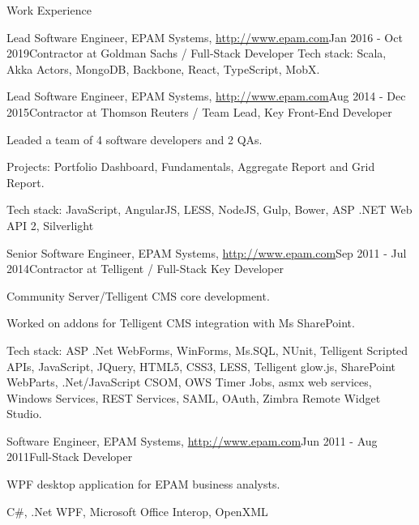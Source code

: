\documentclass{resume}
\begin{document}
\begin{rSection}{Work Experience}
\begin{rSubsection}{Lead Software Engineer, EPAM Systems, \url{http://www.epam.com}}{Jan 2016 - Oct 2019}{Contractor at Goldman Sachs / Full-Stack Developer}{}
Tech stack: Scala, Akka Actors, MongoDB, Backbone, React, TypeScript, MobX.
\end{rSubsection}


\begin{rSubsection}{Lead Software Engineer, EPAM Systems, \url{http://www.epam.com}}{Aug 2014 - Dec 2015}{Contractor at Thomson Reuters / Team Lead, Key Front-End Developer}{}
\item Leaded a team of 4 software developers and 2 QAs.
\item Projects: Portfolio Dashboard, Fundamentals, Aggregate Report and Grid Report.

Tech stack: JavaScript, AngularJS, LESS, NodeJS, Gulp, Bower, ASP .NET Web API 2, Silverlight
\end{rSubsection}

\begin{rSubsection}{Senior Software Engineer, EPAM Systems, \url{http://www.epam.com}}{Sep 2011 - Jul 2014}{Contractor at Telligent / Full-Stack Key Developer}{}
\item Community Server/Telligent CMS core development.
\item Worked on addons for Telligent CMS integration with Ms SharePoint.

Tech stack:  ASP .Net WebForms, WinForms, Ms.SQL, NUnit, Telligent Scripted APIs, JavaScript, JQuery, HTML5,
CSS3, LESS, Telligent glow.js, SharePoint WebParts, .Net/JavaScript CSOM, OWS Timer Jobs, asmx web
services, Windows Services, REST Services, SAML, OAuth, Zimbra Remote Widget Studio.
\end{rSubsection}


\begin{rSubsection}{Software Engineer, EPAM Systems, \url{http://www.epam.com}}{Jun 2011 - Aug 2011}{Full-Stack Developer}{}
\item WPF desktop application for EPAM business analysts.
\item C\#, .Net WPF, Microsoft Office Interop, OpenXML 
\end{rSubsection}

\end{rSection}

\end{document}
